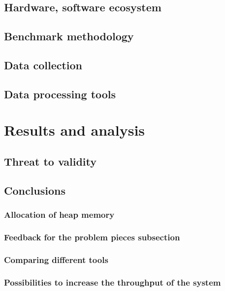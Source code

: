 
\subsection{Hardware, software ecosystem}

\subsection{Benchmark methodology}

\subsection{Data collection}

\subsection{Data processing tools}

\section{Results and analysis}

\subsection{Threat to validity}

\subsection{Conclusions}

\subsubsection{Allocation of heap memory}

\subsubsection{Feedback for the problem pieces subsection}

\subsubsection{Comparing different tools}

\subsubsection{Possibilities to increase the throughput of the system}


